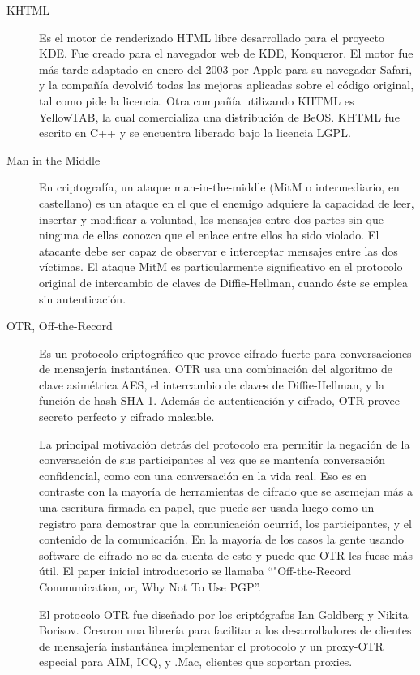\begin{description}
\item[KHTML]
Es el motor de renderizado HTML libre desarrollado para el proyecto KDE. Fue creado para el navegador web de KDE, Konqueror. El motor fue más tarde adaptado en enero del 2003 por Apple para su navegador Safari, y la compañía devolvió todas las mejoras aplicadas sobre el código original, tal como pide la licencia. Otra compañía utilizando KHTML es YellowTAB, la cual comercializa una distribución de BeOS. KHTML fue escrito en C++ y se encuentra liberado bajo la licencia LGPL.

\item[Man in the Middle]
En criptografía, un ataque man-in-the-middle  (MitM o intermediario, en castellano) es un ataque en el que el enemigo adquiere la capacidad de leer, insertar y modificar a voluntad, los mensajes entre dos partes sin que ninguna de ellas conozca que el enlace entre ellos ha sido violado. El atacante debe ser capaz de observar e interceptar mensajes entre las dos víctimas. El ataque MitM es particularmente significativo en el protocolo original de intercambio de claves de Diffie-Hellman, cuando éste se emplea sin autenticación.


\item[OTR, Off-the-Record]
Es un protocolo criptográfico que provee cifrado fuerte para conversaciones de mensajería instantánea. OTR usa una combinación del algoritmo de clave asimétrica AES, el intercambio de claves de Diffie-Hellman, y la función de hash SHA-1. Además de autenticación y cifrado, OTR provee secreto perfecto y cifrado maleable.

La principal motivación detrás del protocolo era permitir la negación de la conversación de sus participantes al vez que se mantenía conversación confidencial, como con una conversación en la vida real. Eso es en contraste con la mayoría de herramientas de cifrado que se asemejan más a una escritura firmada en papel, que puede ser usada luego como un registro para demostrar que la comunicación ocurrió, los participantes, y el contenido de la comunicación. En la mayoría de los casos la gente usando software de cifrado no se da cuenta de esto y puede que OTR les fuese más útil. El paper inicial introductorio se llamaba ``"Off-the-Record Communication, or, Why Not To Use PGP''.

El protocolo OTR fue diseñado por los criptógrafos Ian Goldberg y Nikita Borisov. Crearon una librería para facilitar a los desarrolladores de clientes de mensajería instantánea implementar el protocolo y un proxy-OTR especial para AIM, ICQ, y .Mac, clientes que soportan proxies.



\end{description}
